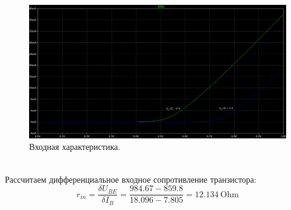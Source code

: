 \documentclass[12pt]{article}
\begin{document}
\begin{figure}[H]
    \centering
    \includegraphics[width=\textwidth]{1_input_char.png}
    \caption{Входная характеристика.}
    \label{fig:1_input_char.png}
\end{figure}\\
Рассчитаем дифференциальное входное сопротивление транзистора:
\[
r_{in} = \frac{\delta U_{BE}}{\delta I_B} = \frac{984.67 - 859.8}{18.096 - 7.805} = 12.134 \ \text{Ohm}
\]
\end{document}
